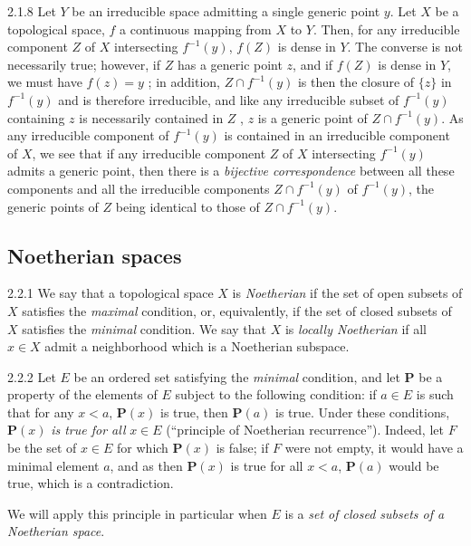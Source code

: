 \documentclass[10pt,oneside]{book}
\begin{document}
\begin{env}{2.1.8}
\label{env-0.2.1.8}
Let $Y$ be an irreducible space admitting a single generic point $y$. Let $X$ be a
topological space, $f$ a continuous mapping from $X$ to $Y$. Then, for any irreducible
component $Z$ of $X$ intersecting $f^{-1}(y)$, $f(Z)$ is dense in $Y$. The converse is not
necessarily true; however, if $Z$ has a generic point $z$, and if $f(Z)$ is dense in $Y$, we
must have $f(z)=y$ ; in addition, $Z\cap f^{-1}(y)$ is then the closure of
$\{z\}$ in $f^{-1}(y)$ and is therefore irreducible, and like any irreducible subset of
$f^{-1}(y)$ containing $z$ is necessarily contained in $Z$ , $z$ is a
generic point of $Z\cap f^{-1}(y)$. As any irreducible component of $f^{-1}(y)$ is contained
in an irreducible component of $X$, we see that if any irreducible component $Z$ of $X$
intersecting $f^{-1}(y)$ admits a generic point, then there is a \emph{bijective
correspondence} between all these components and all the irreducible components
$Z\cap f^{-1}(y)$ of $f^{-1}(y)$, the generic points of $Z$ being identical to those of
$Z\cap f^{-1}(y)$.
\end{env}

\subsection{Noetherian spaces}
\label{0-prelim-2.2}

\begin{env}{2.2.1}
\label{env-0.2.2.1}
We say that a topological space $X$ is \emph{Noetherian} if the set of open subsets of $X$
satisfies the \emph{maximal} condition, or, equivalently, if the set of closed subsets of $X$
satisfies the \emph{minimal} condition. We say that $X$ is \emph{locally Noetherian} if all
$x\in X$ admit a neighborhood which is a Noetherian subspace.
\end{env}

\begin{env}{2.2.2}
\label{env-0.2.2.2}
Let $E$ be an ordered set satisfying the \emph{minimal} condition, and let $\mathbf{P}$ be a
property of the elements of $E$ subject to the following condition: if $a\in E$ is such that
for any $x<a$, $\mathbf{P}(x)$ is true, then $\mathbf{P}(a)$ is true. Under these conditions,
$\mathbf{P}(x)$ \emph{is true for all} $x\in E$ (``principle of Noetherian recurrence'').
Indeed, let $F$ be the set of $x\in E$ for which $\mathbf{P}(x)$ is false; if $F$ were not
empty, it would have a minimal element $a$, and as then $\mathbf{P}(x)$ is true for all
$x<a$, $\mathbf{P}(a)$ would be true, which is a contradiction.

We will apply this principle in particular when $E$ is a \emph{set of closed subsets of a
Noetherian space}.
\end{env}
\end{document}

